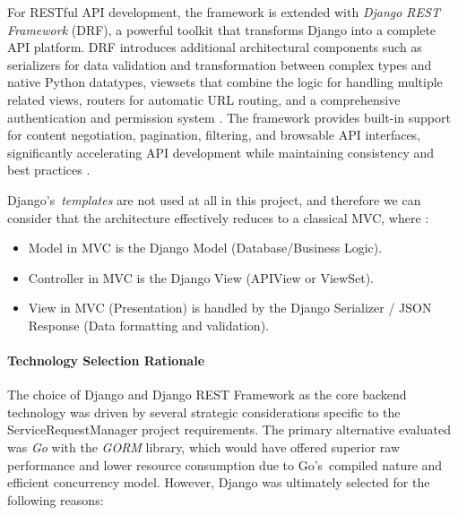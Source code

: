 For RESTful API development, the framework is extended with \textit{Django REST Framework} (DRF), a powerful toolkit that transforms Django into a complete API platform. DRF introduces additional architectural components such as serializers for data validation and transformation between complex types and native Python datatypes, viewsets that combine the logic for handling multiple related views, routers for automatic URL routing, and a comprehensive authentication and permission system \cite{django_rest_framework}. The framework provides built-in support for content negotiation, pagination, filtering, and browsable API interfaces, significantly accelerating API development while maintaining consistency and best practices \cite{django_rest_framework}.

Django's~\textit{templates} are not used at all in this project, and therefore we can consider that the architecture effectively reduces to a classical MVC, where \cite{mvt_architecture}:
\begin{itemize}
  \item Model in MVC is the Django Model (Database/Business Logic).
  \item Controller in MVC is the Django View (APIView or ViewSet).
  \item View in MVC (Presentation) is handled by the Django Serializer / JSON Response (Data formatting and validation).
\end{itemize}

\paragraph{Technology Selection Rationale}

The choice of Django and Django REST Framework as the core backend technology was driven by several strategic considerations specific to the ServiceRequestManager project requirements. The primary alternative evaluated was \textit{Go} with the \textit{GORM} library, which would have offered superior raw performance and lower resource consumption due to Go's~compiled nature and efficient concurrency model. However, Django was ultimately selected for the following reasons:

